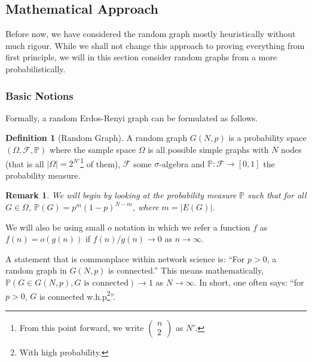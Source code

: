 \documentclass[
]{article}
\newtheorem*{remark}{Remark}
\theoremstyle{definition}
\newtheorem{definition}{Definition}[section]
\begin{document}
\hypertarget{mathematical-approach}{%
\subsection{Mathematical Approach}\label{mathematical-approach}}

Before now, we have considered the random graph mostly heuristically
without much rigour. While we shall not change this approach to proving
everything from first principle, we will in this section consider random
graphs from a more probabilistically.

\hypertarget{basic-notions}{%
\subsubsection{Basic Notions}\label{basic-notions}}

Formally, a random Erdos-Renyi graph can be formulated as follows.

\begin{definition}[Random Graph]
  A random graph \(G(N, p)\) is a probability space \((\Omega, \mathcal{F}, \mathbb{P})\) 
  where the sample space \(\Omega\) is all possible simple graphs with \(N\) 
  nodes (that is all \(\left| \Omega \right| = 2^{N'}\)\footnote{From this point 
  forward, we write \(\begin{pmatrix} n \\ 2 \end{pmatrix}\) as \(N'\).} of them), 
  \(\mathcal{F}\) some \(\sigma\)-algebra and \(\mathbb{P} : \mathcal{F} \to [0, 1]\) 
  the probability measure. 
\end{definition}

\begin{remark}
  We will begin by looking at the probability measure \(\mathbb{P}\) such that 
  for all \(G \in \Omega\), \(\mathbb{P}(G) = p^m (1 - p)^{N - m}\), where 
  \(m = \left| E(G) \right|\).
\end{remark}

We will also be using small \(o\) notation in which we refer a function
\(f\) as \(f(n) = o(g(n))\) if \(f(n) / g(n) \to 0\) as
\(n \to \infty\).

A statement that is commonplace within network science is: ``For
\(p > 0\), a random graph in \(G(N, p)\) is connected.'' This means
mathematically,
\(\mathbb{P}(G \in G(N, p), G \text{ is connected}) \to 1\) as
\(N \to \infty\). In short, one often says: ``for \(p > 0\), \(G\) is
connected w.h.p\footnote{With high probability.}''.
\end{document}
